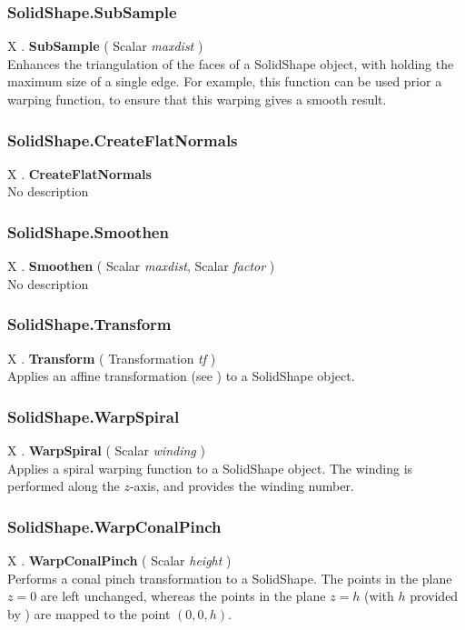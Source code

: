 \subsubsection{SolidShape.SubSample \label{F:SolidShape:SubSample}}
X . \textbf{SubSample} ( Scalar \textit{maxdist} ) \\
Enhances the triangulation of the faces of a SolidShape object, with  holding the maximum size of a single edge. For example, this function can be used prior a warping function, to ensure that this warping gives a smooth result.

\subsubsection{SolidShape.CreateFlatNormals \label{F:SolidShape:CreateFlatNormals}}
X . \textbf{CreateFlatNormals} \\
No description

\subsubsection{SolidShape.Smoothen \label{F:SolidShape:Smoothen}}
X . \textbf{Smoothen} ( Scalar \textit{maxdist}, Scalar \textit{factor} ) \\
No description

\subsubsection{SolidShape.Transform \label{F:SolidShape:Transform}}
X . \textbf{Transform} ( Transformation \textit{tf} ) \\
Applies an affine transformation (see ) to a SolidShape object.

\subsubsection{SolidShape.WarpSpiral \label{F:SolidShape:WarpSpiral}}
X . \textbf{WarpSpiral} ( Scalar \textit{winding} ) \\
Applies a spiral warping function to a SolidShape object. The winding is performed along the $z$-axis, and  provides the winding number.

\subsubsection{SolidShape.WarpConalPinch \label{F:SolidShape:WarpConalPinch}}
X . \textbf{WarpConalPinch} ( Scalar \textit{height} ) \\
Performs a conal pinch transformation to a SolidShape. The points in the plane $z=0$ are left unchanged, whereas the points in the plane $z=h$ (with $h$ provided by ) are mapped to the point $(0,0,h)$.

